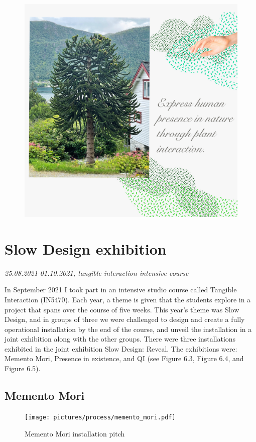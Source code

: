 \begin{figure}[H]
\includegraphics[width=13cm]{pictures/human_presence.jpg}
\centering 
\end{figure}

\section{Slow Design exhibition}
\par
\emph{25.08.2021-01.10.2021, tangible interaction intensive course}
\par

In September 2021 I took part in an intensive studio course called Tangible Interaction (IN5470). Each year, a theme is given that the students explore in a project that spans over the course of five weeks. This year's theme was Slow Design, and in groups of three we were challenged to design and create a fully operational installation by the end of the course, and unveil the installation in a joint exhibition along with the other groups. There were three installations exhibited in the joint exhibition Slow Design: Reveal. The exhibitions were: Memento Mori, Presence in existence, and QI (see Figure 6.3, Figure 6.4, and Figure 6.5).

\subsection{Memento Mori}
\begin{figure}[H]
\texttt{[image: pictures/process/memento\_mori.pdf]}
\caption{Memento Mori installation pitch}
\centering 
\end{figure}

